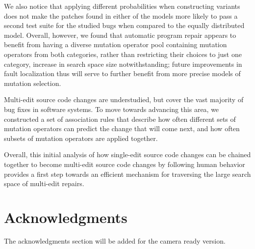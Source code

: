 \documentclass[conference]{IEEEtran}
\begin{document}
We also notice that applying different probabilities when constructing variants
does not make the patches found in either of the models more likely to pass a
second test suite for the studied bugs when compared to the equally distributed model. Overall, however, we found that automatic program repair appears to benefit
from having a diverse mutation operator pool containing mutation operators from 
both categories,
rather than restricting their choices to just one category, increase in search
space size notwithstanding; future improvements in fault localization thus will
serve to further benefit from more precise models of mutation selection. 

Multi-edit source code changes are understudied, but cover
the vast majority of bug fixes in software systems. 
To move towards advancing this area, we constructed a set of association rules 
that describe 
how often different sets of mutation operators can predict the change that will 
come next, and how often subsets of mutation operators are applied together.

Overall, this initial analysis of how single-edit source code changes can be 
chained together 
to become multi-edit source code changes by following human behavior provides a
first step towards an efficient mechanism for traversing the large search space
of multi-edit repairs.






\section*{Acknowledgments}
The acknowledgments section will be added for the camera ready version.






%
%
%







\end{document}
